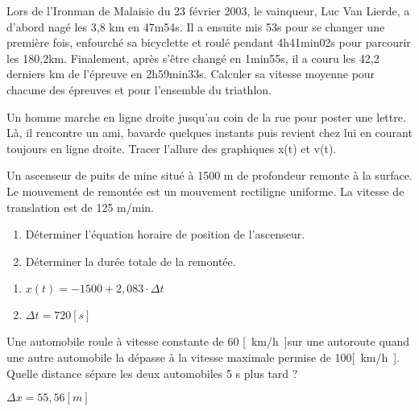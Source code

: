 \begin{exercise}
    Lors de l'Ironman de Malaisie du 23 février 2003, le vainqueur, Luc Van Lierde, a d'abord nagé les 3,8 km en 47m54s. Il a ensuite mis 53s pour se changer une première fois, enfourché sa bicyclette et roulé pendant 4h41min02s pour parcourir les 180,2km. Finalement, après s'être changé en 1min55s, il a couru les 42,2 derniers km de l'épreuve en 2h59min33s. Calculer sa vitesse moyenne pour chacune des épreuves et pour l'ensemble du triathlon.
\end{exercise}
\begin{solution}
\end{solution}


\begin{exercise}
    Un homme marche en ligne droite jusqu'au coin de la rue pour poster une lettre. Là, il rencontre un ami, bavarde quelques instants puis revient chez lui en courant toujours en ligne droite.
    Tracer l'allure des graphiques x(t) et v(t).
\end{exercise}
\begin{solution}
\end{solution}

\begin{exercise}
    Un ascenseur de puits de mine situé à 1500 m de profondeur remonte à la surface. Le mouvement de remontée est un mouvement rectiligne uniforme. La vitesse de translation est de 125 m/min.
    \begin{enumerate}[label=\alph*)]
        \item Déterminer l'équation horaire de position de l'ascenseur.
        \item Déterminer la durée totale de la remontée.
    \end{enumerate}
\end{exercise}
\begin{solution}
    \begin{enumerate}[label=\alph*)]
        \item \(x(t)=-1500 + 2,083 \cdot \Delta t\)
        \item \(\Delta t=720[s]\)
    \end{enumerate}
\end{solution}

\begin{exercise}
    Une automobile roule à vitesse constante de 60 \unit{[km/h]}sur une autoroute quand une autre automobile la dépasse à la vitesse maximale permise de 100\unit{[km/h]}. Quelle distance sépare les deux automobiles 5 s plus tard ?
\end{exercise}
\begin{solution}
    \(\Delta x=55,56\unit{[m]}\)
\end{solution}

